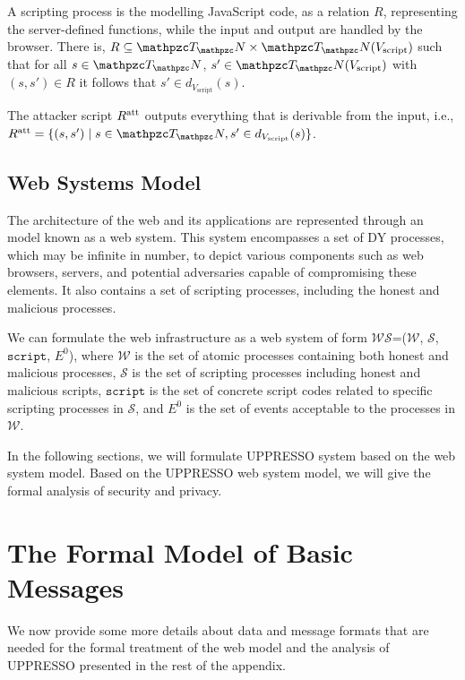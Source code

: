 \begin{definition}
 A scripting process is the modelling JavaScript code, as a relation $R$, representing the server-defined functions, while the input and output are handled by the browser. There is, $R\subseteq \terms \times
  \terms(V_{\text{script}})$ such that for all $s \in \terms$, $s' \in \terms(V_{\text{script}})$ with $(s, s') \in R$ it follows that $s'\in d_{V_{\text{script}}}(s)$.
\end{definition}

\begin{definition}
  The attacker script $R^\text{att}$ outputs everything that is derivable
  from the input, i.e., $\Rasp=\{(s, s')\mid s\in \terms, s'\in
  d_{V_{\text{script}}}(s)\}$.
\end{definition}


\subsection{Web Systems Model}
\label{app:websystemmodel}


The architecture of the web and its applications are represented through an model known as a web system. This system encompasses a set of DY processes, which may be infinite in number, to depict various components such as web browsers, servers, and potential adversaries capable of compromising these elements.
It also contains a set of scripting processes, including the honest and malicious processes.

\begin{definition}
We can formulate the web infrastructure as a web system of form $\mathcal{WS}$=($\mathcal{W}$, $\mathcal{S}$, $\mathtt{script}$, $E^0$), where $\mathcal{W}$ is the set of atomic processes containing both honest and malicious processes, $\mathcal{S}$ is the set of scripting processes including honest and malicious scripts, $\mathtt{script}$ is the set of concrete script codes related to specific scripting processes in $\mathcal{S}$, and $E^0$ is the set of events acceptable to the processes in $\mathcal{W}$.
\end{definition}

In the following sections, we will formulate UPPRESSO system based on the web system model. Based on the UPPRESSO web system model, we will give the formal analysis of security and privacy.  


\section{The Formal Model of Basic Messages}
We now provide some more details about data and message formats that are needed for the formal treatment of the web model and the analysis of UPPRESSO presented in the rest of the appendix.


